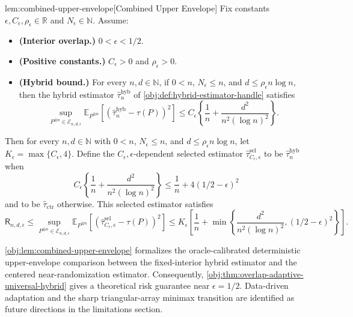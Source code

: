\begin{lemmav}{lem:combined-upper-envelope}[Combined Upper Envelope]
Fix constants \(\epsilon,C_\epsilon,\rho_\epsilon\in\mathbb R\) and \(N_\epsilon\in\mathbb N\). Assume:
\begin{itemize}
\item \textbf{(Interior overlap.)} \(0<\epsilon<1/2\).
\item \textbf{(Positive constants.)} \(C_\epsilon>0\) and \(\rho_\epsilon>0\).
\item \textbf{(Hybrid bound.)} For every \(n,d\in\mathbb N\), if \(0<n\), \(N_\epsilon\le n\), and \(d\le \rho_\epsilon n\log n\), then the hybrid estimator \(\widehat\tau_n^{\mathrm{hyb}}\) of \cref{obj:def:hybrid-estimator-handle} satisfies
\[
\sup_{P^{\otimes n}\in\mathcal E_{n,d,\epsilon}}
\mathbb E_{P^{\otimes n}}\!\left[\left(\widehat\tau_n^{\mathrm{hyb}}-\tau(P)\right)^2\right]
\le
C_\epsilon\left\{\frac1n+\frac{d^2}{n^2(\log n)^2}\right\}.
\]
\end{itemize}
Then for every \(n,d\in\mathbb N\) with \(0<n\), \(N_\epsilon\le n\), and \(d\le \rho_\epsilon n\log n\), let \(K_\epsilon=\max\{C_\epsilon,4\}\). Define the \(C_\epsilon,\epsilon\)-dependent selected estimator \(\widehat\tau^{\mathrm{sel}}_{C_\epsilon,\epsilon}\) to be \(\widehat\tau_n^{\mathrm{hyb}}\) when
\[
C_\epsilon\left\{\frac1n+\frac{d^2}{n^2(\log n)^2}\right\}
\le
\frac1n+4(1/2-\epsilon)^2
\]
and to be \(\widehat\tau_{\mathrm{ctr}}\) otherwise. This selected estimator satisfies
\[
\mathsf R_{n,d,\epsilon}\le
\sup_{P^{\otimes n}\in\mathcal E_{n,d,\epsilon}}
\mathbb E_{P^{\otimes n}}\!\left[\left(\widehat\tau^{\mathrm{sel}}_{C_\epsilon,\epsilon}-\tau(P)\right)^2\right]
\le
K_\epsilon\left[
\frac1n+
\min\left\{\frac{d^2}{n^2(\log n)^2},(1/2-\epsilon)^2\right\}
\right].
\]
\end{lemmav}

\cref{obj:lem:combined-upper-envelope} formalizes the oracle-calibrated deterministic upper-envelope comparison between the fixed-interior hybrid estimator and the centered near-randomization estimator. Consequently, \cref{obj:thm:overlap-adaptive-universal-hybrid} gives a theoretical risk guarantee near \(\epsilon=1/2\). Data-driven adaptation and the sharp triangular-array minimax transition are identified as future directions in the limitations section.
